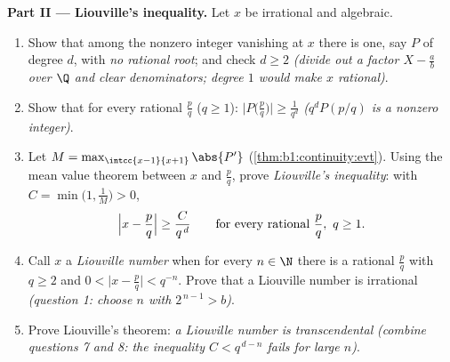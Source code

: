 \begin{problem}
\medskip
\noindent\textbf{Part II --- Liouville's inequality.} Let $x$ be
irrational and algebraic.
\begin{enumerate}[resume]
  \item Show that among the nonzero integer 
        vanishing at $x$ there is one, say $P$ of degree $d$,
        with \emph{no rational root}; and check $d \geq 2$
        \emph{(divide out a factor $X - \frac ab$ over $\Q$ and
        clear denominators; degree $1$ would make $x$
        rational)}.
  \item Show that for every rational $\frac pq$ ($q \geq 1$):
        $\bigl|P\bigl(\frac pq\bigr)\bigr| \geq \frac{1}{q^d}$
        \emph{($q^d P(p/q)$ is a nonzero integer)}.
  \item Let $M = \max_{\intcc{x-1}{x+1}} \abs{P'}$
        (\cref{thm:b1:continuity:evt}). Using the mean value
        theorem between $x$ and $\frac pq$, prove
        \emph{Liouville's inequality}: with $C = \min\bigl(1,
        \frac 1M\bigr) > 0$,
        \[
        \Bigl| x - \frac pq \Bigr| \geq \frac{C}{q^{\,d}}
        \qquad\text{for every rational } \frac pq,\ q \geq 1 .
        \]
  \item Call $x$ a \emph{Liouville number} when for every $n \in
        \N$ there is a rational $\frac pq$ with $q \geq 2$ and
        $0 < \bigl|x - \frac pq\bigr| < q^{-n}$. Prove that a
        Liouville number is irrational \emph{(question 1: choose
        $n$ with $2^{\,n-1} > b$)}.
  \item Prove Liouville's theorem: \emph{a Liouville number is
        transcendental} \emph{(combine questions 7 and 8: the
        inequality $C < q^{\,d-n}$ fails for large $n$)}.
\end{enumerate}


\end{problem}

